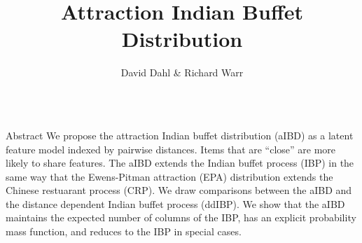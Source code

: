 \documentclass[serif,mathserif,final]{beamer}
\title{Attraction Indian Buffet Distribution}
\author{David Dahl \& Richard Warr}
\institute{Brigham Young University}
\begin{document}
\begin{frame}{}
  \begin{columns}[t]

    \begin{column}{0.25\linewidth}

      \begin{block}{Abstract}
        We propose the attraction Indian buffet distribution (aIBD) as 
        a latent feature model indexed by pairwise distances.
        Items that are ``close'' are more likely to share features.
        The aIBD extends the Indian buffet process (IBP) in the same way
        that the Ewens-Pitman attraction (EPA) distribution extends the
        Chinese restuarant process (CRP).
        We draw comparisons between the aIBD and the distance dependent Indian
        buffet process (ddIBP). We show that the aIBD maintains the expected
        number of columns of the IBP, has an explicit probability mass
        function, and reduces to the IBP in special cases.

      \end{block}


\end{column}
\end{columns}
\end{frame}
\end{document}
